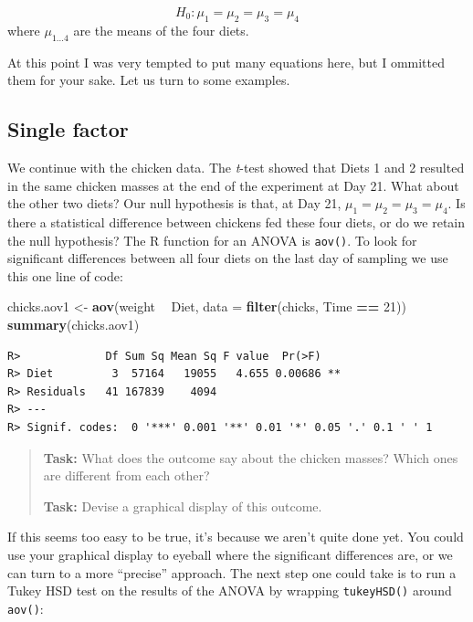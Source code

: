 \documentclass[english,10pt,a4paper,oneside]{book}
\newenvironment{Shaded}{\begin{snugshade}}{\end{snugshade}}
\newcommand{\KeywordTok}[1]{\textcolor[rgb]{0.13,0.29,0.53}{\textbf{#1}}}
\newcommand{\DataTypeTok}[1]{\textcolor[rgb]{0.13,0.29,0.53}{#1}}
\newcommand{\DecValTok}[1]{\textcolor[rgb]{0.00,0.00,0.81}{#1}}
\newcommand{\StringTok}[1]{\textcolor[rgb]{0.31,0.60,0.02}{#1}}
\newcommand{\OperatorTok}[1]{\textcolor[rgb]{0.81,0.36,0.00}{\textbf{#1}}}
\newcommand{\NormalTok}[1]{#1}
\theoremstyle{definition}
\theoremstyle{definition}
\theoremstyle{definition}
\theoremstyle{remark}
\begin{document}
\[H_{0}:\mu_{1}=\mu_{2}=\mu_{3}=\mu_{4}\] where \(\mu_{1...4}\) are the
means of the four diets.

At this point I was very tempted to put many equations here, but I
ommitted them for your sake. Let us turn to some examples.

\subsection{Single factor}\label{single-factor}

We continue with the chicken data. The \emph{t}-test showed that Diets 1
and 2 resulted in the same chicken masses at the end of the experiment
at Day 21. What about the other two diets? Our null hypothesis is that,
at Day 21, \(\mu_{1}=\mu_{2}=\mu_{3}=\mu_{4}\). Is there a statistical
difference between chickens fed these four diets, or do we retain the
null hypothesis? The R function for an ANOVA is \texttt{aov()}. To look
for significant differences between all four diets on the last day of
sampling we use this one line of code:

\begin{Shaded}
\begin{Highlighting}[]
\NormalTok{chicks.aov1 <-}\StringTok{ }\KeywordTok{aov}\NormalTok{(weight }\OperatorTok{~}\StringTok{ }\NormalTok{Diet, }\DataTypeTok{data =} \KeywordTok{filter}\NormalTok{(chicks, Time }\OperatorTok{==}\StringTok{ }\DecValTok{21}\NormalTok{))}
\KeywordTok{summary}\NormalTok{(chicks.aov1)}
\end{Highlighting}
\end{Shaded}

\begin{verbatim}
R>             Df Sum Sq Mean Sq F value  Pr(>F)   
R> Diet         3  57164   19055   4.655 0.00686 **
R> Residuals   41 167839    4094                   
R> ---
R> Signif. codes:  0 '***' 0.001 '**' 0.01 '*' 0.05 '.' 0.1 ' ' 1
\end{verbatim}

\begin{quote}
\textbf{Task:} What does the outcome say about the chicken masses? Which
ones are different from each other?

\textbf{Task:} Devise a graphical display of this outcome.
\end{quote}

If this seems too easy to be true, it's because we aren't quite done
yet. You could use your graphical display to eyeball where the
significant differences are, or we can turn to a more \enquote{precise}
approach. The next step one could take is to run a Tukey HSD test on the
results of the ANOVA by wrapping \texttt{tukeyHSD()} around
\texttt{aov()}:
\end{document}
